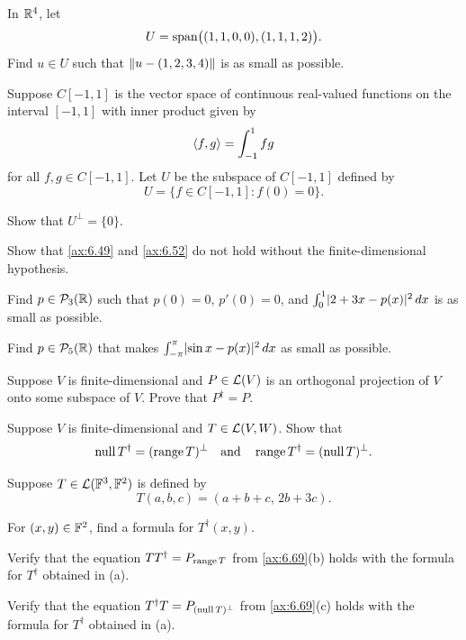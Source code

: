 \begin{exc}
\begin{exercise}
In $\mathbb{R}^4$, let
\[ U = \operatorname{span}\bigl((1,1,0,0),(1,1,1,2)\bigr). \]
Find $u\in U$ such that $\lVert u-(1,2,3,4) \rVert$ is as small as possible.
\end{exercise}

\begin{exercise}
Suppose $C[-1,1]$ is the vector space of continuous real-valued functions on
the interval $[-1,1]$ with inner product given by
\[ \langle f, g \rangle = \int_{-1}^{1} fg \]
for all $f,g\in C[-1,1]$. Let $U$ be the subspace of $C[-1,1]$ defined by
\[ U = \{f\in C[-1,1] : f(0)=0\}. \]
\begin{parts}
\item Show that $U^\perp=\{0\}$.
\item Show that \ref{ax:6.49} and \ref{ax:6.52} do not hold without the
  finite-dimensional hypothesis.
\end{parts}
\end{exercise}

\begin{exercise}
Find $p\in\mathcal{P}_3(\mathbb{R})$ such that $p(0)=0$, $p'(0)=0$, and
$\int_0^1\lvert 2+3x-p(x) \rvert^2\,dx$ is as small as possible.
\end{exercise}

\begin{exercise}
Find $p\in\mathcal{P}_5(\mathbb{R})$ that makes $\int_{-\pi}^{\pi}\lvert \sin x-p(x) \rvert^2\,dx$ as
small as possible.
\end{exercise}

\begin{exercise}
Suppose $V$ is finite-dimensional and $P\in\mathcal{L}(V)$ is an orthogonal projection
of $V$ onto some subspace of $V$. Prove that $P^\dagger=P$.
\end{exercise}

\begin{exercise}
Suppose $V$ is finite-dimensional and $T\in\mathcal{L}(V,W)$. Show that
\[ \operatorname{null} T^\dagger = (\operatorname{range} T)^\perp \quad\text{and}\quad
   \operatorname{range} T^\dagger = (\operatorname{null} T)^\perp. \]
\end{exercise}

\begin{exercise}
Suppose $T\in\mathcal{L}(\mathbb{F}^3,\mathbb{F}^2)$ is defined by
\[ T(a,b,c) = (a+b+c,\,2b+3c). \]
\begin{parts}
\item For $(x,y)\in\mathbb{F}^2$, find a formula for $T^\dagger(x,y)$.
\item Verify that the equation $TT^\dagger=P_{\operatorname{range} T}$ from
  \ref{ax:6.69}(b) holds with the formula for $T^\dagger$ obtained in (a).
\item Verify that the equation $T^\dagger T=P_{(\operatorname{null} T)^\perp}$ from
  \ref{ax:6.69}(c) holds with the formula for $T^\dagger$ obtained in (a).
\end{parts}
\end{exercise}


\end{exc}
